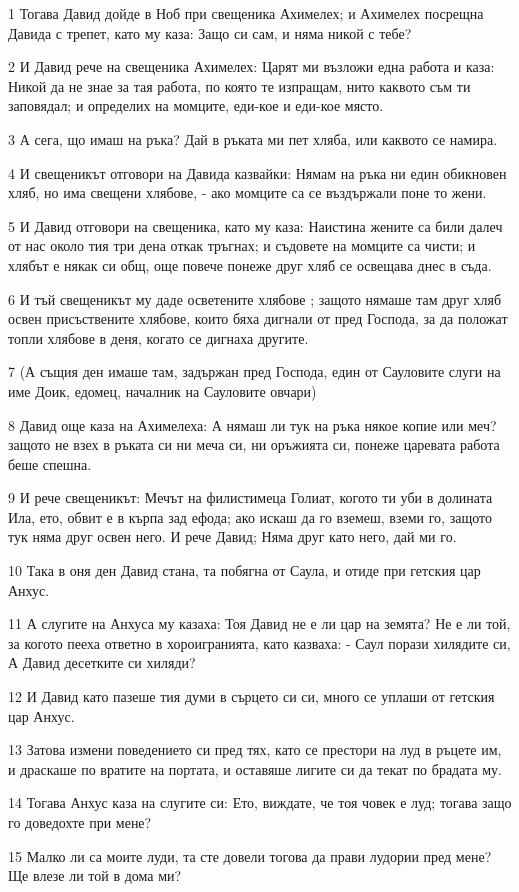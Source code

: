 \par 1 Тогава Давид дойде в Ноб при свещеника Ахимелех; и Ахимелех посрещна Давида с трепет, като му каза: Защо си сам, и няма никой с тебе?
\par 2 И Давид рече на свещеника Ахимелех: Царят ми възложи една работа и каза: Никой да не знае за тая работа, по която те изпращам, нито каквото съм ти заповядал; и определих на момците, еди-кое и еди-кое място.
\par 3 А сега, що имаш на ръка? Дай в ръката ми пет хляба, или каквото се намира.
\par 4 И свещеникът отговори на Давида казвайки: Нямам на ръка ни един обикновен хляб, но има свещени хлябове, - ако момците са се въздържали поне то жени.
\par 5 И Давид отговори на свещеника, като му каза: Наистина жените са били далеч от нас около тия три дена откак тръгнах; и съдовете на момците са чисти; и хлябът е някак си общ, още повече понеже друг хляб се освещава днес в съда.
\par 6 И тъй свещеникът му даде осветените хлябове ; защото нямаше там друг хляб освен присъствените хлябове, които бяха дигнали от пред Господа, за да положат топли хлябове в деня, когато се дигнаха другите.
\par 7 (А същия ден имаше там, задържан пред Господа, един от Сауловите слуги на име Доик, едомец, началник на Сауловите овчари)
\par 8 Давид още каза на Ахимелеха: А нямаш ли тук на ръка някое копие или меч? защото не взех в ръката си ни меча си, ни оръжията си, понеже царевата работа беше спешна.
\par 9 И рече свещеникът: Мечът на филистимеца Голиат, когото ти уби в долината Ила, ето, обвит е в кърпа зад ефода; ако искаш да го вземеш, вземи го, защото тук няма друг освен него. И рече Давид; Няма друг като него, дай ми го.
\par 10 Така в оня ден Давид стана, та побягна от Саула, и отиде при гетския цар Анхус.
\par 11 А слугите на Анхуса му казаха: Тоя Давид не е ли цар на земята? Не е ли той, за когото пееха ответно в хороигранията, като казваха: - Саул порази хилядите си, А Давид десетките си хиляди?
\par 12 И Давид като пазеше тия думи в сърцето си си, много се уплаши от гетския цар Анхус.
\par 13 Затова измени поведението си пред тях, като се престори на луд в ръцете им, и драскаше по вратите на портата, и оставяше лигите си да текат по брадата му.
\par 14 Тогава Анхус каза на слугите си: Ето, виждате, че тоя човек е луд; тогава защо го доведохте при мене?
\par 15 Малко ли са моите луди, та сте довели тогова да прави лудории пред мене? Ще влезе ли той в дома ми?

